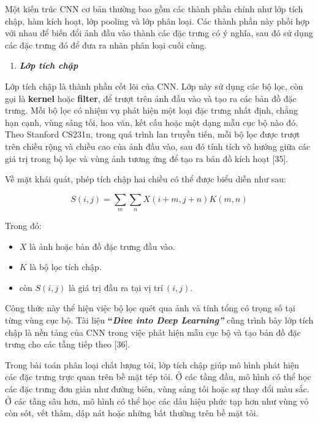 \documentclass[
]{article}
\begin{document}
Một kiến trúc CNN cơ bản thường bao gồm các thành phần chính như lớp
tích chập, hàm kích hoạt, lớp pooling và lớp phân loại. Các thành phần
này phối hợp với nhau để biến đổi ảnh đầu vào thành các đặc trưng có ý
nghĩa, sau đó sử dụng các đặc trưng đó để đưa ra nhãn phân loại cuối
cùng.

\begin{enumerate}
\def\labelenumi{\arabic{enumi}.}
\setcounter{enumi}{1}
\item
  \protect{}\label{_Toc232112006}{}\emph{\textbf{Lớp tích
  chập}}
\end{enumerate}

Lớp tích chập là thành phần cốt lõi của CNN. Lớp này sử dụng các bộ lọc,
còn gọi là \textbf{kernel} hoặc \textbf{filter}, để trượt trên ảnh đầu
vào và tạo ra các bản đồ đặc trưng. Mỗi bộ lọc có nhiệm vụ phát hiện một
loại đặc trưng nhất định, chẳng hạn cạnh, vùng sáng tối, hoa văn, kết
cấu hoặc một dạng mẫu cục bộ nào đó. Theo Stanford CS231n, trong quá
trình lan truyền tiến, mỗi bộ lọc được trượt trên chiều rộng và chiều
cao của ảnh đầu vào, sau đó tính tích vô hướng giữa các giá trị trong bộ
lọc và vùng ảnh tương ứng để tạo ra bản đồ kích hoạt {[}35{]}.

Về mặt khái quát, phép tích chập hai chiều có thể được biểu diễn như
sau:

\[
S(i,j)=\sum_m \sum_n X(i+m,j+n)K(m,n)
\]

Trong đó:

\begin{itemize}
\item
  \(X\) là ảnh hoặc bản đồ đặc trưng đầu vào.
\item
  \(K\) là bộ lọc tích chập.
\item
  còn \(S(i,j)\) là giá trị đầu ra tại vị trí\(\ (i,j)\).
\end{itemize}

Công thức này thể hiện việc bộ lọc quét qua ảnh và tính tổng có trọng số
tại từng vùng cục bộ. Tài liệu \textbf{``\emph{Dive into Deep
Learning''}} cũng trình bày lớp tích chập là nền tảng của CNN trong việc
phát hiện mẫu cục bộ và tạo bản đồ đặc trưng cho các tầng tiếp theo
{[}36{]}.

Trong bài toán phân loại chất lượng tỏi, lớp tích chập giúp mô hình phát
hiện các đặc trưng trực quan trên bề mặt tép tỏi. Ở các tầng đầu, mô
hình có thể học các đặc trưng đơn giản như đường biên, vùng sáng tối
hoặc sự thay đổi màu sắc. Ở các tầng sâu hơn, mô hình có thể học các dấu
hiệu phức tạp hơn như vùng vỏ còn sót, vết thâm, dập nát hoặc những bất
thường trên bề mặt tỏi.
\end{document}
